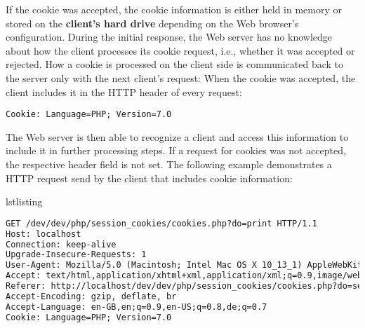 \documentclass[a4paper, justified, notoc]{tufte-handout} %
\makeatletter
\newenvironment{listing}[1][htbp]
  {\ifvmode\else\unskip\fi\begin{@tufte@float}[#1]{lstlisting}{}}
  {\end{@tufte@float} } %
\makeatother
\begin{document}
If the cookie was accepted, the cookie information is either held in memory or stored on the \textbf{client's hard drive} depending on the Web browser's configuration. %
During the initial response, the Web server has no knowledge about how the client processes its cookie request, i.e., whether it was accepted or rejected.
How a cookie is processed on the client side is communicated back to the server only with the next client's request: When the cookie was accepted, the client includes it in the HTTP header of every request:
\begin{Verbatim}
Cookie: Language=PHP; Version=7.0
\end{Verbatim}
The Web server is then able to recognize a client and access this information to include it in further processing steps.
If a request for cookies was not accepted, the respective header field is not set.
The following example demonstrates a HTTP request send by the client that includes cookie information:
\begin{listing}
\begin{lstlisting}[language=HTML]
GET /dev/dev/php/session_cookies/cookies.php?do=print HTTP/1.1
Host: localhost
Connection: keep-alive
Upgrade-Insecure-Requests: 1
User-Agent: Mozilla/5.0 (Macintosh; Intel Mac OS X 10_13_1) AppleWebKit/537.36 (KHTML, like Gecko) Chrome/63.0.3239.84 Safari/537.36
Accept: text/html,application/xhtml+xml,application/xml;q=0.9,image/webp,image/apng,*/*;q=0.8
Referer: http://localhost/dev/dev/php/session_cookies/cookies.php?do=set
Accept-Encoding: gzip, deflate, br
Accept-Language: en-GB,en;q=0.9,en-US;q=0.8,de;q=0.7
Cookie: Language=PHP; Version=7.0
\end{lstlisting}
	\caption{A client's HTTP request with cookie data included}
	\label{setting_cookies}
\end{listing}
\end{document}

